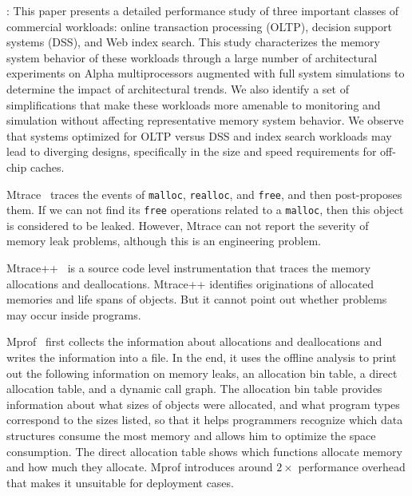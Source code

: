 
\cite{Barroso:1998:MSC:279358.279363}: This paper presents a detailed performance study of three important classes of commercial workloads: online transaction processing (OLTP), decision support systems (DSS), and Web index search.  This study characterizes the memory system behavior of these workloads through a large number of architectural experiments on Alpha multiprocessors augmented with full system simulations to determine the impact of architectural trends. We also identify a set of simplifications that make these workloads more amenable to monitoring and simulation without affecting representative memory system behavior. We observe that systems optimized for OLTP versus DSS and index search workloads may lead to diverging designs, specifically in the size and speed requirements for off-chip caches.

Mtrace~\cite{mtrace} traces the events of \texttt{malloc}, \texttt{realloc}, and \texttt{free}, and then post-proposes them. If we can not find its \texttt{free} operations related to a \texttt{malloc}, then this object is considered to be leaked. However, Mtrace can not report the severity of memory leak problems, although this is an engineering problem.    

Mtrace++~\cite{Lee:2000:DMM:786772.787150} is a source code level instrumentation that traces the memory allocations and deallocations. Mtrace++ identifies originations of allocated memories and life spans of objects. But it cannot point out whether problems may occur inside programs. 

Mprof~\cite{Zorn:1988:MAP:894814} first collects the information about allocations and deallocations and writes the information into a file. In the end, it uses the offline analysis to print out the following information on memory leaks, an allocation bin table, a direct allocation table, and a dynamic call graph. The allocation bin table provides information about what sizes of objects were allocated, and what program types correspond to the sizes listed, so that it helps programmers recognize which data structures consume the most memory and allows him to optimize the space consumption. 
The direct allocation table shows which functions allocate memory and how much they allocate. Mprof introduces around $2\times$ performance overhead that makes it unsuitable for deployment cases. 


